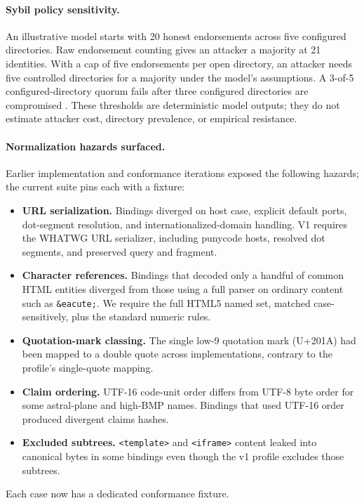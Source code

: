 \documentclass{article}
\begin{document}
\paragraph{Sybil policy sensitivity.} An illustrative model starts with 20 honest endorsements across five configured directories. Raw endorsement counting gives an attacker a majority at 21 identities. With a cap of five endorsements per open directory, an attacker needs five controlled directories for a majority under the model's assumptions. A 3-of-5 configured-directory quorum fails after three configured directories are compromised \cite{HTMLTrustStudy1}. These thresholds are deterministic model outputs; they do not estimate attacker cost, directory prevalence, or empirical resistance.

\paragraph{Normalization hazards surfaced.} Earlier implementation and conformance iterations exposed the following hazards; the current suite pins each with a fixture:
\begin{itemize}
  \item \textbf{URL serialization.} Bindings diverged on host case, explicit default ports, dot-segment resolution, and internationalized-domain handling. V1 requires the WHATWG URL serializer, including punycode hosts, resolved dot segments, and preserved query and fragment.
  \item \textbf{Character references.} Bindings that decoded only a handful of common HTML entities diverged from those using a full parser on ordinary content such as \texttt{\&eacute;}. We require the full HTML5 named set, matched case-sensitively, plus the standard numeric rules.
  \item \textbf{Quotation-mark classing.} The single low-9 quotation mark (U+201A) had been mapped to a double quote across implementations, contrary to the profile's single-quote mapping.
  \item \textbf{Claim ordering.} UTF-16 code-unit order differs from UTF-8 byte order for some astral-plane and high-BMP names. Bindings that used UTF-16 order produced divergent claims hashes.
  \item \textbf{Excluded subtrees.} \texttt{<template>} and \texttt{<iframe>} content leaked into canonical bytes in some bindings even though the v1 profile excludes those subtrees.
\end{itemize}
Each case now has a dedicated conformance fixture.
\end{document}
